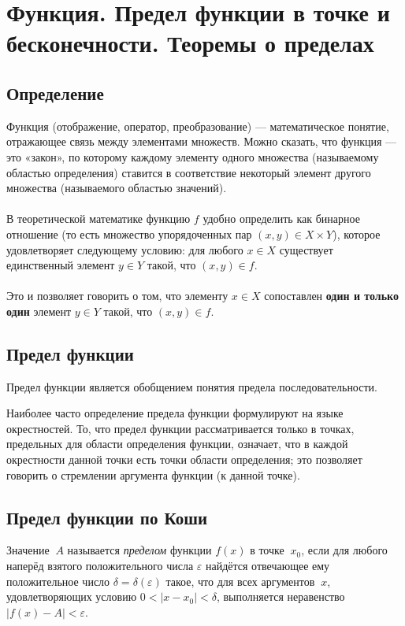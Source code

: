 \section{Функция. Предел функции в точке и бесконечности. Теоремы о пределах}

\subsection{Определение}

Функция (отображение, оператор, преобразование) — математическое понятие, отражающее связь между элементами множеств. Можно сказать, что функция — это «закон», по которому каждому элементу одного множества (называемому областью определения) ставится в соответствие некоторый элемент другого множества (называемого областью значений).
\\\\
В теоретической математике функцию $f$ удобно определить как бинарное отношение (то есть множество упорядоченных пар $(x,y)\in X\times Y$), которое удовлетворяет следующему условию: для любого $x\in X$ существует единственный элемент $y\in Y$ такой, что $(x,y)\in f$.
\\\\
Это и позволяет говорить о том, что элементу $x\in X$ сопоставлен \textbf{один и только один} элемент $y\in Y$ такой, что $(x,y)\in f$.

\subsection{Предел функции}

Предел функции является обобщением понятия предела последовательности.

Наиболее часто определение предела функции формулируют на языке окрестностей. То, что предел функции рассматривается только в точках, предельных для области определения функции, означает, что в каждой окрестности данной точки есть точки области определения; это позволяет говорить о стремлении аргумента функции (к данной точке).

\subsection{Предел функции по Коши}

Значение $~A$ называется \textit{пределом} функции $f \left( x \right)$ в точке $~x_0$, если для любого наперёд взятого положительного числа $\varepsilon$ найдётся отвечающее ему положительное число $\delta = \delta \left( \varepsilon \right)$ такое, что для всех аргументов $~x$, удовлетворяющих условию $0 < \left| x - x_0 \right| < \delta$, выполняется неравенство $\left| f \left( x \right) - A \right| < \varepsilon$.

